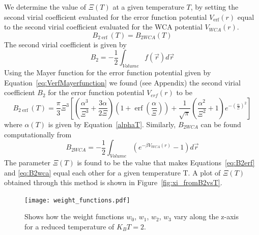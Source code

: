 \documentclass[double,12pt]{beavtex}
\begin{document}
We determine the value of $\Xi(T)$ at a given temperature $T$,
by setting the second virial coefficient evaluated for the error 
function potential $V_{\operatorname{erf}}(r)$ equal to the second virial 
coefficient evaluated for the WCA potential $V_{WCA}(r)$.
\begin{equation}B_{2\operatorname{erf}}(T) =B_{2WCA}(T)\end{equation}
The second virial coefficient is given by
\begin{equation}B_2=-\frac{1}{2}\int_{Volume}f(\vec{r})d\vec r\end{equation}
Using the Mayer function for the error function potential given by 
Equation~\ref{eq:VerfMayerfunction} we found (see Appendix) the second 
virial coefficient $B_{2}$ for the error function potential $V_{erf}(r)$ 
to be
\begin{equation} \label{eq:B2erf}
	B_{2\operatorname{erf}}(T) = \frac{\pi}{3}\Xi^3\left[\left(\frac{\alpha^3}{\Xi^3}+\frac{3\alpha}{2\Xi}\right)\left(1+\operatorname{\operatorname{erf}}\left(\frac{\alpha}{\Xi}\right)\right)+\frac{1}{\sqrt{\pi}}\left(\frac{\alpha^2}{\Xi^2}+1\right)e^{-\left(\frac{\alpha}{\Xi}\right)^2}\right]
\end{equation}
where $\alpha(T)$ is given by Equation~\ref{alphaT}. Similarly, 
$B_{2WCA}$ can be found computationally from 
\begin{equation} \label{eq:B2wca}
	B_{2WCA}=-\frac{1}{2}\int_{Volume}\left(e^{-\beta{V}_{WCA}(r)}-1\right)d\vec{r} 
\end{equation}
The parameter $\Xi(T)$ is found to be the value that makes Equations~\ref{eq:B2erf} 
and \ref{eq:B2wca} equal each other for a given temperature T. 
A plot of $\Xi(T)$ obtained through this method is shown in 
Figure~\ref{fig:xi_fromB2vsT}.

\begin{figure}
  \centering
  \texttt{[image: weight\_functions.pdf]}
  \caption{Shows how the weight functions $w_0$, $w_1$, $w_2$, $w_3$ 
  vary along the z-axis for a reduced temperature of $K_BT=2$.}
  \label{fig:weight_functions}
\end{figure}


\end{document}

